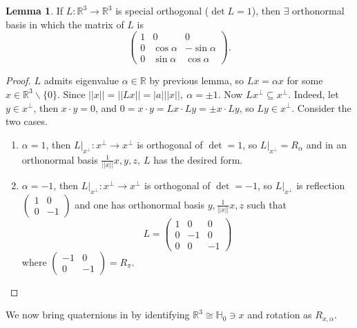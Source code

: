 \documentclass[a4paper]{article}
\newcommand{\R}{\mathbb{R}}
\newcommand{\Hq}{\mathbb{H}}
\theoremstyle{definition}
\newtheorem{lemma}[defn]{Lemma}
\begin{document}
\begin{lemma}
\label{lemma:SOmatrixform}
If $L:\R^3\rightarrow\R^3$ is special orthogonal ($\det L=1$), then $\exists$ orthonormal basis in which the matrix of $L$ is
\[
\begin{pmatrix}
1 & 0 & 0 \\
0 & \cos\alpha & -\sin\alpha \\
0 & \sin\alpha & \cos\alpha
\end{pmatrix}.
\]
\end{lemma}
\begin{proof}
$L$ admits eigenvalue $\alpha\in\R$ by previous lemma, so $Lx=\alpha x$ for some $x\in\R^3\backslash\{0\}$. Since $||x||=||Lx||=|a|||x||,\ \alpha=\pm 1$. Now $Lx^\perp\subseteq x^\perp$. Indeed, let $y\in x^\perp$, then $x\cdot y=0$, and $0=x\cdot y=Lx\cdot Ly=\pm x\cdot Ly$, so $Ly\in x^\perp$. Consider the two cases.
\begin{enumerate}
\item $\alpha=1$, then $L|_{x^\perp}:x^\perp\rightarrow x^\perp$ is orthogonal of $\det=1$, so $L|_{x^\perp}=R_\alpha$ and in an orthonormal basis $\frac{1}{||x||}x,y,z,\ L$ has the desired form.
\item $\alpha=-1$, then $L|_{x^\perp}:x^\perp\rightarrow x^\perp$ is orthogonal of $\det=-1$, so $L|_{x^\perp}$ is reflection $\begin{pmatrix}1&0\\0&-1\end{pmatrix}$ and one has orthonormal basis $y,\frac{1}{||x||}x,z$ such that
\[
L=\begin{pmatrix}1&0&0\\0&-1&0\\0&0&-1\end{pmatrix}
\]
where $\begin{pmatrix}-1&0\\0&-1\end{pmatrix}=R_\pi$.
\end{enumerate}
\end{proof}

We now bring quaternions in by identifying $\R^3\cong\Hq_0\ni x$ and rotation as $R_{x,\alpha}$.
\end{document}
